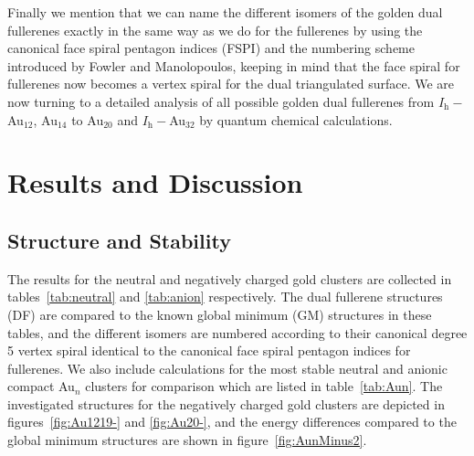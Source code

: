 Finally we mention that we can name the different isomers of the golden dual
fullerenes exactly in the same way as we do for the fullerenes by using the
canonical face spiral pentagon indices (FSPI) and the numbering scheme
introduced by Fowler and Manolopoulos,\autocite{Fowler-atlas-2006} keeping in
mind that the face spiral for fullerenes now becomes a vertex spiral for the
dual triangulated surface. We are now turning to a detailed analysis of all
possible golden dual fullerenes from $I_\mathrm{h}-$Au$_{12}$, Au$_{14}$ to Au$_{20}$
and $I_\mathrm{h}-$Au$_{32}$ by quantum chemical calculations.



\section{\label{sec:ResDis}Results and Discussion}
\subsection{Structure and Stability}

The results for the neutral and negatively charged gold clusters are collected in
tables~\ref{tab:neutral} and \ref{tab:anion} respectively. The dual fullerene
structures (DF) are compared to the known global minimum (GM) structures in
these tables, and the different isomers are numbered according to their
canonical degree 5 vertex spiral identical to the canonical face spiral
pentagon indices for fullerenes.\autocite{Fowler-atlas-2006} We also include
calculations for the most stable neutral and anionic compact Au$_n$
clusters for comparison which are listed in table~\ref{tab:Aun}. The
investigated structures for the
negatively charged gold clusters are depicted in figures~\ref{fig:Au1219-} and
\ref{fig:Au20-}, and the energy differences compared to the global minimum structures
are shown in figure~\ref{fig:AunMinus2}.

